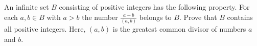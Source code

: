 An infinite set $B$ consisting of positive integers has the following property. For each $a,b \in B$ with $a>b$ the number $\frac{a-b}{(a,b)}$ belongs to $B$. Prove that $B$ contains all positive integers. Here, $(a,b)$ is the greatest common divisor of numbers $a$ and $b$.